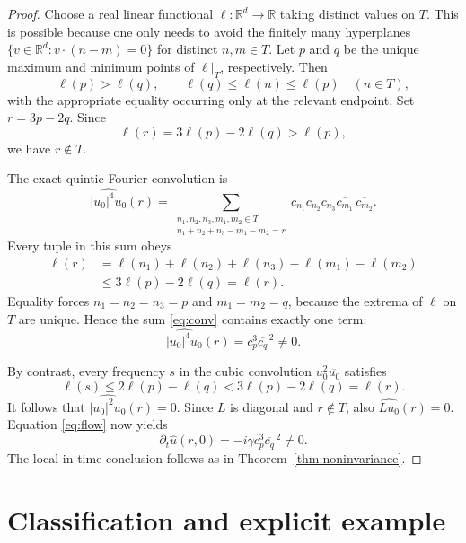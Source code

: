 \documentclass[11pt]{amsart}
\newcommand{\R}{\mathbb R}
\begin{document}
\begin{proof}
Choose a real linear functional $\ell:\R^d\to\R$ taking distinct
values on $T$.  This is possible because one only needs to avoid the
finitely many hyperplanes
$\{v\in\R^d:v\cdot(n-m)=0\}$ for distinct $n,m\in T$.
Let $p$ and $q$ be the unique maximum and minimum points of $\ell|_T$,
respectively.  Then
\[
 \ell(p)>\ell(q),\qquad
 \ell(q)\le\ell(n)\le\ell(p)\quad(n\in T),
\]
with the appropriate equality occurring only at the relevant endpoint.
Set $r=3p-2q$.  Since
\[
 \ell(r)=3\ell(p)-2\ell(q)>\ell(p),
\]
we have $r\notin T$.

The exact quintic Fourier convolution is
\begin{equation}\label{eq:conv}
 \widehat{|u_0|^4u_0}(r)
 =\sum_{\substack{n_1,n_2,n_3,m_1,m_2\in T\\
                n_1+n_2+n_3-m_1-m_2=r}}
 c_{n_1}c_{n_2}c_{n_3}
 \overline{c_{m_1}}\,\overline{c_{m_2}}.
\end{equation}
Every tuple in this sum obeys
\[
 \begin{aligned}
 \ell(r)
 &=\ell(n_1)+\ell(n_2)+\ell(n_3)-\ell(m_1)-\ell(m_2)\\
 &\le 3\ell(p)-2\ell(q)=\ell(r).
 \end{aligned}
\]
Equality forces $n_1=n_2=n_3=p$ and $m_1=m_2=q$, because the
extrema of $\ell$ on $T$ are unique.  Hence the sum
\eqref{eq:conv} contains exactly one term:
\begin{equation}\label{eq:universal-quintic}
 \widehat{|u_0|^4u_0}(r)=c_p^3\overline{c_q}^{\,2}\ne0.
\end{equation}

By contrast, every frequency $s$ in the cubic convolution
$u_0^2\overline{u_0}$ satisfies
\[
 \ell(s)\le2\ell(p)-\ell(q)
  <3\ell(p)-2\ell(q)=\ell(r).
\]
It follows that $\widehat{|u_0|^2u_0}(r)=0$.
Since $L$ is diagonal and $r\notin T$, also
$\widehat{Lu_0}(r)=0$.  Equation \eqref{eq:flow} now yields
\begin{equation}\label{eq:universal-leakage}
 \partial_t\widehat u(r,0)
  =-i\gamma c_p^3\overline{c_q}^{\,2}\ne0.
\end{equation}
The local-in-time conclusion follows as in Theorem~\ref{thm:noninvariance}.
\end{proof}

\section{Classification and explicit example}
\end{document}

